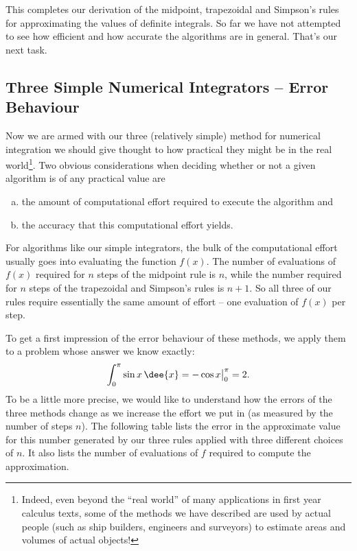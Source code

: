 This completes our derivation of the midpoint, trapezoidal and
Simpson's rules for approximating the values of definite integrals.
So far we have not  attempted to see how efficient and how accurate
the algorithms are in general. That's our next task.


\subsection{Three Simple Numerical Integrators -- Error Behaviour}\label{ssec num int err}
Now we are armed with our three (relatively simple) method for numerical integration we
should give thought to how practical they might be in the real world\footnote{Indeed,
even beyond the ``real world'' of many applications in first year calculus texts, some of
the methods we have described are used by actual people (such as ship builders, engineers
and surveyors) to estimate areas and volumes of actual objects!}. Two obvious
considerations when deciding whether or not  a given algorithm is of
any practical value are
\begin{enumerate}[(a)]
\item the amount of computational effort required to execute the algorithm and
\item the accuracy that this computational effort yields.
\end{enumerate}
For algorithms like our simple integrators, the bulk of the computational effort usually
goes into evaluating the function $f(x)$. The number of evaluations of $f(x)$ required for
$n$ steps of the midpoint rule is $n$, while the number required for $n$ steps of the
trapezoidal and Simpson's rules is $n+1$. So all three of our rules require essentially
the same amount of effort -- one evaluation of $f(x)$ per step.

To get a first impression of the error behaviour of these methods, we apply them to a
problem whose answer we know exactly:
\begin{align*}
  \int_0^\pi\sin x\,\dee{x}=-\cos x\big|_0^\pi = 2.
\end{align*}
To be a little more precise, we would like to understand how the errors of the three
methods change as we increase the effort we put in (as measured by the number
of steps $n$). The following table lists the error in the approximate value
for this number generated by our three rules applied with three different
choices of $n$. It also lists the number of
evaluations of $f$ required to compute the approximation.

